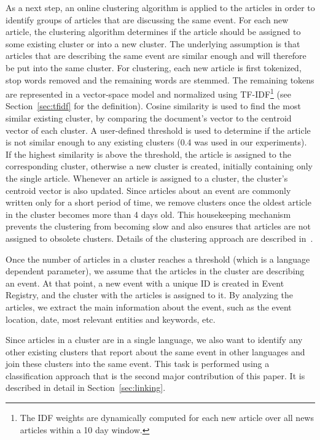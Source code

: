 \documentclass[twoside,11pt]{article}
\begin{document}
As a next step, an online clustering algorithm is applied to the articles in order to identify groups of articles that are discussing the same event. For each new article, the clustering algorithm determines if the article should be assigned to some existing cluster or into a new cluster. The underlying assumption is that articles that are describing the same event are similar enough and will therefore be put into the same cluster. For clustering, each new article is first tokenized, stop words removed and the remaining words are stemmed.
The remaining tokens are represented in a vector-space model and normalized using TF-IDF\footnote{The IDF weights are dynamically computed for each new article over all news articles within a 10 day window.} (see Section~\ref{sec:tfidf} for the definition). Cosine similarity is used to find the most similar existing cluster, by comparing the document's vector to the centroid vector of each cluster. A user-defined threshold is used to determine if the article is not similar enough to any existing clusters (0.4 was used in our experiments).  If the highest similarity is above the threshold, the article is assigned to the corresponding cluster, otherwise a new cluster is created, initially containing only the single article. Whenever an article is assigned to a cluster, the cluster's centroid vector is also updated. Since articles about an event are commonly written only for a short period of time, we remove clusters once the oldest article in the cluster becomes more than 4 days old. This housekeeping mechanism prevents the clustering from becoming slow and also ensures that articles are not assigned to obsolete clusters. Details of the clustering approach are described in~\cite{brank2014}.

Once the number of articles in a cluster reaches a threshold (which is a language dependent parameter), we assume that the articles in the cluster are describing an event. At that point, a new event with a unique ID is created in Event Registry, and the cluster with the articles is assigned to it. By analyzing the articles, we extract the main information about the event, such as the event location, date, most relevant entities and keywords, etc.

Since articles in a cluster are in a single language, we also want to identify any other existing clusters that report about the same event in other languages and join these clusters into the same event. This task is performed using a classification approach that is the second major contribution of this paper. It is described in detail in Section~\ref{sec:linking}.
\end{document}
